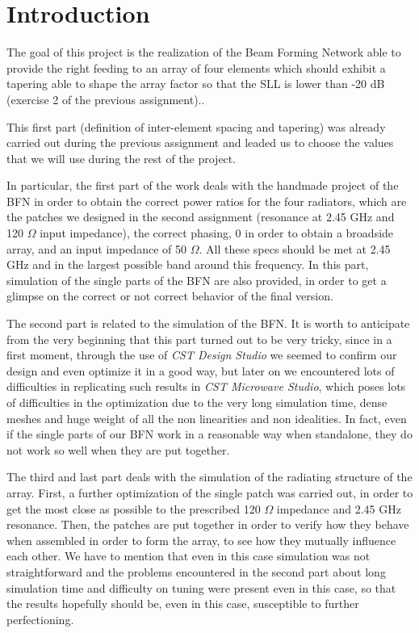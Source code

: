 \section{Introduction}
The goal of this project is the realization of the Beam Forming Network able to provide the right feeding to an array of four elements which should exhibit a tapering able to shape the array factor so that the SLL is lower than -20 dB (exercise 2 of the previous assignment)..

\par\medskip
\noindent
This first part (definition of inter-element spacing and tapering) was already carried out during the previous assignment and leaded us to choose the values that we will use during the rest of the project.

\par\medskip
\noindent
In particular, the first part of the work deals with the handmade project of the BFN in order to obtain the correct power ratios for the four radiators, which are the patches we designed in the second assignment (resonance at 2.45 GHz and 120 $\Omega$ input impedance), the correct phasing, 0 in order to obtain a broadside array, and an input impedance of 50 $\Omega$. All these specs should be met at 2.45 GHz and in the largest possible band around this frequency.
\noindent
In this part, simulation of the single parts of the BFN are also provided, in order to get a glimpse on the correct or not correct behavior of the final version.

\par\medskip
\noindent
The second part is related to the simulation of the BFN. It is worth to anticipate from the very beginning that this part turned out to be very tricky, since in a first moment, through the use of \textit{CST Design Studio} we seemed to confirm our design and even optimize it in a good way, but later on we encountered lots of difficulties in replicating such results in \textit{CST Microwave Studio}, which poses lots of difficulties in the optimization due to the very long simulation time, dense meshes and huge weight of all the non linearities and non idealities. In fact, even if the single parts of our BFN work in a reasonable way when standalone, they do not work so well when they are put together. 

\par\medskip
\noindent
The third and last part deals with the simulation of the radiating structure of the array. First, a further optimization of the single patch was carried out, in order to get the most close as possible to the prescribed 120 $\Omega$ impedance and 2.45 GHz resonance. Then, the patches are put together in order to verify how they behave when assembled in order to form the array, to see how they mutually influence each other. We have to mention that even in this case simulation was not straightforward and the problems encountered in the second part about long simulation time and difficulty on tuning were present even in this case, so that the results hopefully should be, even in this case, susceptible to further perfectioning.